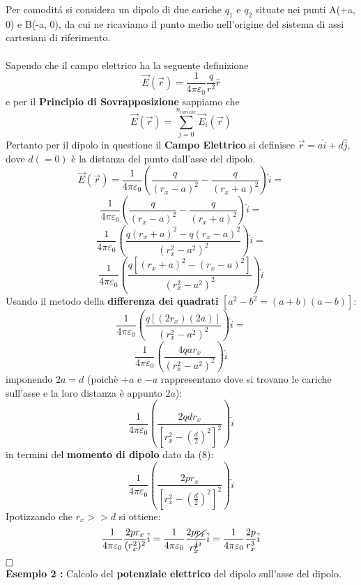 Per comodit\'a si considera un dipolo di due cariche $q_1$ e $q_2$ situate nei punti A(+a, 0) e B(-a, 0), da cui ne ricaviamo il punto medio nell'origine del sistema di assi cartesiani di riferimento.\\
\\
Sapendo che il campo elettrico ha la seguente definizione
\begin{equation}
	\vec{E}(\vec{r}) = \frac{1}{4 \pi \varepsilon_0} \frac{q}{r^2} \hat{r}
\end{equation}
e per il \textbf{Principio di Sovrapposizione} sappiamo che
\begin{equation}
    \vec{E}(\vec{r}) = \sum_{j = 0}^{n_{cariche}}{\vec{E}_i(\vec{r})}
\end{equation}
Pertanto per il dipolo in questione il \textbf{Campo Elettrico} si definisce $\vec{r} = a\hat{i} + d\hat{j}$, dove $d (= 0)$ \`e la distanza del punto dall'asse del dipolo.
$$ \vec{E}(\vec{r}) = \frac{1}{4 \pi \varepsilon_0} \left(\frac{q}{(r_x - a)^2} - \frac{q}{(r_x + a)^2}\right)\hat{i} =
$$
$$ \frac{1}{4 \pi \varepsilon_0} \left(\frac{q}{(r_x - a)^2} - \frac{q}{(r_x + a)^2}\right)\hat{i} = 
$$
$$
\frac{1}{4 \pi \varepsilon_0} \left(\frac{q(r_x + a)^2 - q(r_x - a)^2}{(r_x^2 - a^2)^2}\right)\hat{i} = 
$$
$$
\frac{1}{4 \pi \varepsilon_0} \left(\frac{q\left[(r_x + a)^2 - (r_x - a)^2\right]}{(r_x^2 - a^2)^2}\right)\hat{i}
$$
Usando il metodo della \textbf{differenza dei quadrati} $\left[a^2 - b^2 = (a+b)(a-b)\right]$:
$$
\frac{1}{4 \pi \varepsilon_0} \left(\frac{q\left[(2r_x)(2a)\right]}{(r_x^2 - a^2)^2}\right)\hat{i} = 
$$
$$
\frac{1}{4 \pi \varepsilon_0} \left(\frac{4qar_x}{(r_x^2 - a^2)^2}\right)\hat{i}
$$
imponendo $2a = d$ (poich\`e $+a$ e $-a$ rappresentano dove si trovano le cariche sull'asse e la loro distanza \`e appunto $2a$):
$$
\frac{1}{4 \pi \varepsilon_0} \left(\frac{2qdr_x}{\left[r_x^2 - \left(\frac{d}{2}\right)^2\right]^2}\right)\hat{i}
$$
in termini del \textbf{momento di dipolo} dato da (8):
$$
\frac{1}{4 \pi \varepsilon_0} \left(\frac{2pr_x}{\left[r_x^2 - \left(\frac{d}{2}\right)^2\right]^2}\right)\hat{i}
$$
Ipotizzando che $r_x >> d$ si ottiene:
$$
\frac{ 1 }{ 4 \pi \varepsilon_0 } 
\frac{ 2pr_x }{ (r_x^2)^2 } 
\hat{ i } = 
\frac{ 1 }{ 4 \pi \varepsilon_0 } 
\frac{ 2p\cancel{ r_x } }{ r_x^{\cancel{ 4 }^3} } 
\hat{ i } = 
\frac{ 1 }{ 4 \pi \varepsilon_0 } 
\frac{ 2p}{ r_x^3 } 
\hat{ i }
$$
$\hfill\square$ \\
\textbf{Esempio 2 :} Calcolo del \textbf{potenziale elettrico} del dipolo sull'asse del dipolo.\\
